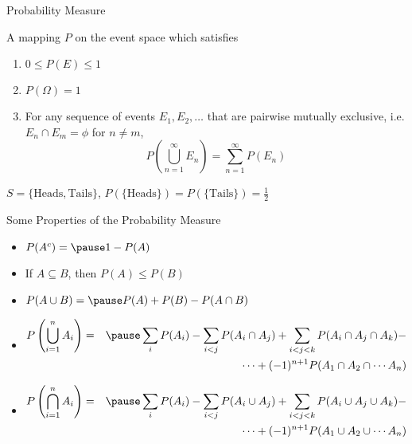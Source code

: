 \documentclass[t]{beamer}
\begin{document}
\begin{frame}{Probability Measure}
  \footnotesize
  \pause
  \begin{definition}
    A mapping $P$ on the event space which satisfies
    \begin{enumerate}
      \pause
      \item $0 \leq P(E) \leq 1$
      \pause
      \item $P(\Omega) = 1$
      \pause
      \item For any sequence of events $E_1,E_2, \ldots$ that are pairwise mutually
      exclusive, i.e. $E_n \cap E_m = \phi$ for $n\neq m$, 
      \begin{equation*}
      P\left( \bigcup_{n=1}^{\infty} E_n \right) = \sum_{n=1}^{\infty} P(E_n)
      \end{equation*}
      \end{enumerate}
  \end{definition}
  \pause
  \begin{example}
    $S = \{\text{Heads}, \text{Tails}\}$, $P(\{\text{Heads}\}) = P(\{\text{Tails}\}) = \frac{1}{2}$
  \end{example}
  \normalsize
\end{frame}

\begin{frame}{Some Properties of the Probability Measure}
  \footnotesize
  \begin{itemize}
    \item \pause $P(A^c) = \pause 1-P(A)$
    \item \pause If $ A \subseteq B$, then \pause $P(A) \leq P(B)$
    \item \pause $P(A \cup B) = \pause P(A) + P(B) - P(A \cap B)$
    \item \pause
      \begin{eqnarray*}
        P\left(\bigcup_{i=1}^{n} A_i\right)  & = & \pause \sum_i P(A_i) - \sum_{i < j} P(A_i \cap A_j) + \sum_{i < j < k} P(A_i \cap A_j \cap A_k) - \\
                                                  &   & \cdots + (-1)^{n+1} P(A_1 \cap A_2 \cap \cdots A_n)
      \end{eqnarray*}
    \item \pause
      \begin{eqnarray*}
        P\left(\bigcap_{i=1}^{n} A_i\right)  & = & \pause \sum_i P(A_i) - \sum_{i < j} P(A_i \cup A_j) + \sum_{i < j < k} P(A_i \cup A_j \cup A_k) - \\
                                                  &   & \cdots + (-1)^{n+1} P(A_1 \cup A_2 \cup \cdots A_n)
      \end{eqnarray*}
  \end{itemize}
  \normalsize
\end{frame}
\end{document}
